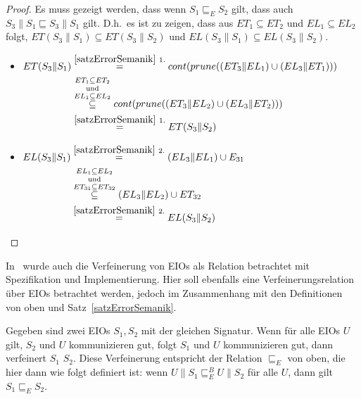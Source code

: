 \begin{proof}
  Es muss gezeigt werden, dass wenn $S_1\sqsubseteq _E S_2$ gilt, dass auch
  $S_3\|S_1\sqsubseteq S_3\|S_1$ gilt. D.h.\ es ist zu zeigen, dass aus
  $ET_1\subseteq ET_2$ und $EL_1\subseteq EL_2$ folgt, $ET(S_3\|S_1)\subseteq
  ET(S_3\|S_2)$ und $EL(S_3\|S_1)\subseteq EL(S_3\|S_2)$.\\
  \begin{itemize}
    \item $\begin{aligned}[t]
        ET(S_3\|S_1) &\overset{\ref{satzErrorSemanik}~1.}{=}
      cont(prune((ET_3\|EL_1)\cup (EL_3\|ET_1)))\\
      &\overset{ET_1\subseteq
    ET_2}{\overset{\mathrm{und}}{\overset{EL_1\subseteq EL_2}{\subseteq}}}
    cont(prune((ET_3\|EL_2)\cup (EL_3\|ET_2)))\\
      &\overset{\ref{satzErrorSemanik}~1.}{=} ET(S_3\|S_2)
    \end{aligned}$
    \item $\begin{aligned}[t]
        EL(S_3\|S_1) &\overset{\ref{satzErrorSemanik}~2.}{=} (EL_3\|EL_1)\cup
        E_{31}\\
      &\overset{EL_1\subseteq
      EL_2}{\overset{\mathrm{und}}{\overset{ET_{31}\subseteq
      ET_{32}}{\subseteq}}} (EL_3\|EL_2)\cup ET_{32}\\
      &\overset{\ref{satzErrorSemanik}~2.}{=} EL(S_3\|S_2)
    \end{aligned}$
  \end{itemize}
\end{proof}

In~\cite{Vogler2014EIO} wurde auch die Verfeinerung von EIOs als Relation betrachtet
mit Spezifikation und Implementierung. Hier soll ebenfalls eine
Verfeinerungsrelation über EIOs betrachtet werden, jedoch im Zusammenhang mit
den Definitionen von oben und Satz~\ref{satzErrorSemanik}.

\begin{lem}
  \label{lemVerfeinerung}
  Gegeben sind zwei EIOs $S_1, S_2$ mit der gleichen Signatur. Wenn
  für alle EIOs $U$ gilt, $S_2$ und $U$ kommunizieren gut, folgt $S_1$
  und $U$ kommunizieren gut, dann verfeinert $S_1$ $S_2$. Diese Verfeinerung
  entspricht der Relation $\sqsubseteq _E$ von oben, die hier dann wie folgt
  definiert ist: wenn $U\|S_1 \sqsubseteq _E^B U\|S_2$ für alle $U$, dann gilt
  $S_1\sqsubseteq _E S_2$.
\end{lem}

